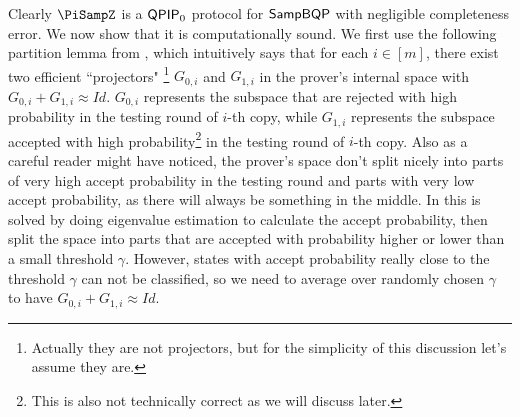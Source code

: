 Clearly $\PiSampZ$ is a $\operatorname{\mathsf{QPIP}}_0$ protocol for $\operatorname{\mathsf{SampBQP}}$ with negligible completeness error.
We now show that it is computationally sound.
We first use the following partition lemma from \cite{arXiv:ChiaChungYam19}, which intuitively says that for each $i\in[m]$, there exist two efficient ``projectors" \footnote{Actually they are not projectors, but for the simplicity of this discussion let's assume they are.} $G_{0,i}$ and $G_{1,i}$ in the prover's internal space with $G_{0,i}+G_{1,i} \approx Id$. $G_{0,i}$ represents the subspace that are rejected with high probability in the testing round of $i$-th copy, while $G_{1,i}$  represents the subspace accepted with high probability\footnote{This is also not technically correct as we will discuss later.} in the testing round of $i$-th copy.
Also as a careful reader might have noticed, the prover's space don't split nicely into parts of very high accept probability in the testing round and parts with very low accept probability, as there will always be something in the middle. In \cite{arXiv:ChiaChungYam19} this is solved by doing eigenvalue estimation  to calculate the accept probability, then split the space into parts that are accepted with probability higher or lower than a small threshold $\gamma$. However, states with accept probability really close to the threshold $\gamma$ can not be classified, so we need to average over randomly chosen $\gamma$ to have $G_{0,i}+G_{1,i} \approx Id$.

